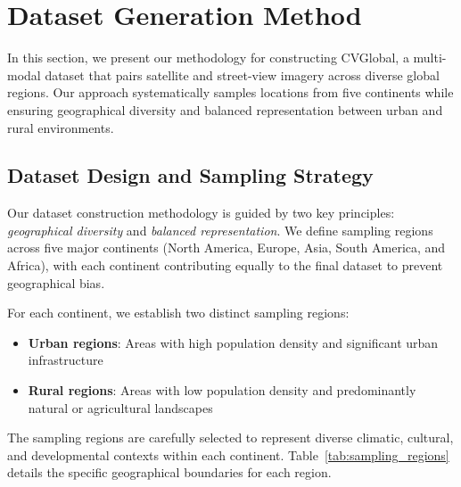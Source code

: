 \documentclass{bmvc2k}
\begin{document}
\section{Dataset Generation Method}
\label{sec:dataset_generation}

In this section, we present our methodology for constructing CVGlobal, a multi-modal dataset that pairs satellite and street-view imagery across diverse global regions. Our approach systematically samples locations from five continents while ensuring geographical diversity and balanced representation between urban and rural environments.

\subsection{Dataset Design and Sampling Strategy}

Our dataset construction methodology is guided by two key principles: \textit{geographical diversity} and \textit{balanced representation}. We define sampling regions across five major continents (North America, Europe, Asia, South America, and Africa), with each continent contributing equally to the final dataset to prevent geographical bias.

For each continent, we establish two distinct sampling regions:
\begin{itemize}
    \item \textbf{Urban regions}: Areas with high population density and significant urban infrastructure
    \item \textbf{Rural regions}: Areas with low population density and predominantly natural or agricultural landscapes
\end{itemize}

The sampling regions are carefully selected to represent diverse climatic, cultural, and developmental contexts within each continent. Table~\ref{tab:sampling_regions} details the specific geographical boundaries for each region.
\end{document}

